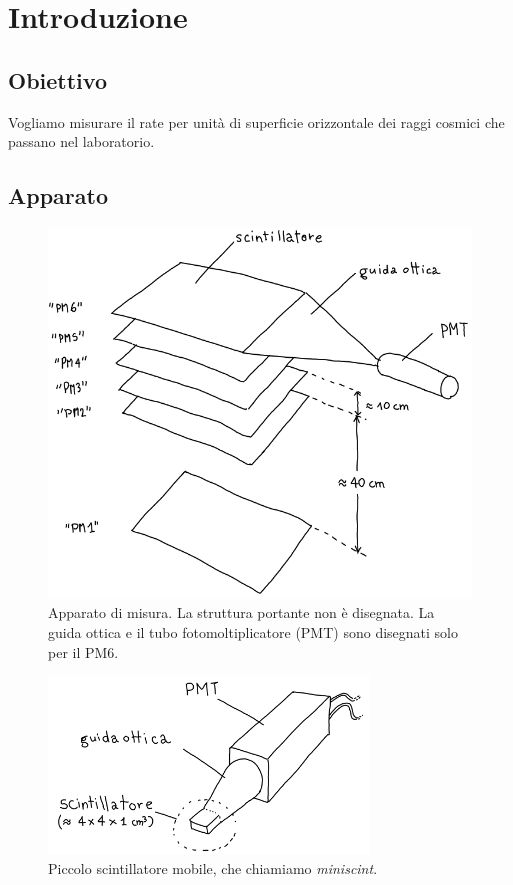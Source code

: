 \section{Introduzione}

\subsection{Obiettivo}

Vogliamo misurare il rate per unità di superficie orizzontale
dei raggi cosmici che passano nel laboratorio.

\subsection{Apparato}

\begin{figure}[H]
	\center
	\includegraphics[width=\textwidth]{apparato}
	\caption{\label{fig:apparato}
	Apparato di misura.
	La struttura portante non è disegnata.
	La guida ottica e il tubo fotomoltiplicatore (PMT) sono disegnati solo per il PM6.}
\end{figure}

\begin{figure}[H]
	\center
	\includegraphics[width=23em]{miniscint}
	\caption{\label{fig:miniscint}
	Piccolo scintillatore mobile, che chiamiamo \emph{miniscint}.}
\end{figure}

